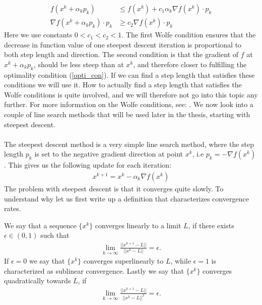 \begin{align}
f(x^k + \alpha_kp_k)&\leq f(x^k) + c_1\alpha_k\nabla f(x^k)\cdot p_k \label{wolf1}\\
\nabla f(x^k + \alpha_kp_k) \cdot p_k &\geq c_2 \nabla f(x^k)\cdot p_k\label{wolf2}
\end{align}
Here we use constants $0<c_1<c_2<1$. The first Wolfe condition ensures that the decrease in function value of one steepest descent iteration is proportional to both step length and direction. The second condition is that the gradient of $f$ at $x^k + \alpha_kp_k$, should be less steep than at $x^k$, and therefore closer to fulfilling the optimality condition (\ref{opti_con}). If we can find a step length that satisfies these conditions we will use it. How to actually find a step length that satisfies the Wolfe conditions is quite involved, and we will therefore not go into this topic any further. For more information on the Wolfe conditions, see: \cite{wolfe1969convergence, wolfe1971convergence}. We now look into a couple of line search methods that will be used later in the thesis, starting with steepest descent.
\\
\\
The steepest descent method is a very simple line search method, where the step length $p_k$ is set to the negative gradient direction at point $x^k$, i.e $p_k = -\nabla f(x^k)$. This gives us the following update for each iteration:
\begin{align}
x^{k+1} = x^k - \alpha_k \nabla f(x^k) \label{SD_itr}
\end{align} 
The problem with steepest descent is that it converges quite slowly. To understand why let us first write up a definition that characterizes convergence rates.
\begin{definition} \label{convergence_def}
We say that a sequence $\{x^k\}$ converges linearly to a limit $L$, if there exists $\epsilon\in(0,1)$ such that
\begin{align*}
\lim_{k\rightarrow\infty}\frac{||x^{k+1}-L||}{||x^k-L||} =\epsilon.
\end{align*} 
If $\epsilon=0$ we say that $\{x^k\}$ converges superlinearly to $L$, while $\epsilon=1$ is characterized as sublinear convergence. Lastly we say that $\{x^k\}$ converges quadratically towards $L$, if
\begin{align*}
\lim_{k\rightarrow\infty}\frac{||x^{k+1}-L||}{||x^k-L||^2} =\epsilon.
\end{align*}
\end{definition}
\noindent
